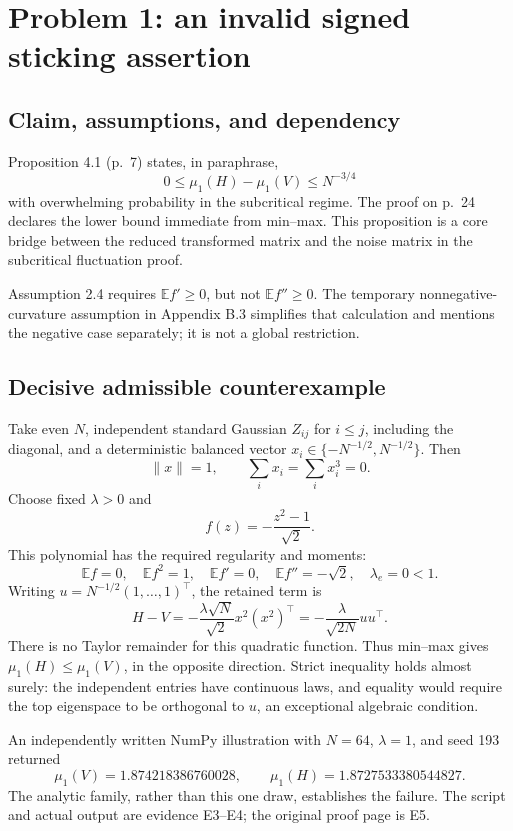 \documentclass[10pt]{article}
\begin{document}
\section*{Problem 1: an invalid signed sticking assertion}
\subsection*{Claim, assumptions, and dependency}
Proposition 4.1 (p. 7) states, in paraphrase, \[0\leq \mu_1(H)-\mu_1(V)\leq N^{-3/4}\] with overwhelming probability in the subcritical regime. The proof on p. 24 declares the lower bound immediate from min–max. This proposition is a core bridge between the reduced transformed matrix and the noise matrix in the subcritical fluctuation proof.\par
Assumption 2.4 requires \(\mathbb E f'\geq0\), but not \(\mathbb E f''\geq0\). The temporary nonnegative-curvature assumption in Appendix B.3 simplifies that calculation and mentions the negative case separately; it is not a global restriction.\par
\subsection*{Decisive admissible counterexample}
Take even \(N\), independent standard Gaussian \(Z_{ij}\) for \(i\leq j\), including the diagonal, and a deterministic balanced vector \(x_i\in\{-N^{-1/2},N^{-1/2}\}\). Then \[\|x\|=1,\qquad \sum_i x_i=\sum_i x_i^3=0.\] Choose fixed \(\lambda>0\) and \[f(z)=-\frac{z^2-1}{\sqrt2}.\] This polynomial has the required regularity and moments: \[\mathbb E f=0,\quad \mathbb E f^2=1,\quad
 \mathbb E f'=0,\quad \mathbb E f''=-\sqrt2,\quad \lambda_e=0<1.\] Writing \(u=N^{-1/2}(1,\ldots,1)^\top\), the retained term is \[H-V=-\frac{\lambda\sqrt N}{\sqrt2}x^2(x^2)^\top
     =-\frac{\lambda}{\sqrt{2N}}uu^\top.\] There is no Taylor remainder for this quadratic function. Thus min–max gives \(\mu_1(H)\leq\mu_1(V)\), in the opposite direction. Strict inequality holds almost surely: the independent entries have continuous laws, and equality would require the top eigenspace to be orthogonal to \(u\), an exceptional algebraic condition.\par
An independently written NumPy illustration with \(N=64\), \(\lambda=1\), and seed 193 returned \[\mu_1(V)=1.874218386760028,\qquad
 \mu_1(H)=1.8727533380544827.\] The analytic family, rather than this one draw, establishes the failure. The script and actual output are evidence E3–E4; the original proof page is E5.\par
\end{document}
